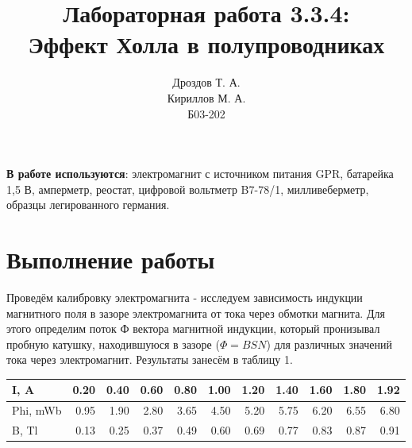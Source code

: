 \documentclass[a4paper]{article}
\title{Лабораторная работа 3.3.4:\\Эффект Холла в полупроводниках}
\author{Дроздов Т. А.\\Кириллов М. А.\\Б03-202}
\date{}
\begin{document}
\maketitle

\textbf{В работе используются}: электромагнит с источником питания GPR, батарейка 1,5 В, амперметр, реостат, цифровой вольтметр B7-78/1, милливеберметр, образцы легированного германия.


\section*{Выполнение работы}


    Проведём калибровку электромагнита - исследуем зависимость индукции магнитного поля в зазоре электромагнита от тока через обмотки магнита. Для этого определим поток Ф вектора магнитной индукции, который пронизывал пробную катушку, находившуюся в зазоре ($\Phi = BSN$) для различных значений тока через электромагнит. Результаты занесём в таблицу 1.
    

\begin{table}[]
\begin{tabular}{|l|r|r|r|r|r|r|r|r|r|r|}
\hline
I, A     & 0.20 & 0.40 & 0.60 & 0.80 & 1.00 & 1.20 & 1.40 & 1.60 & 1.80 & 1.92 \\ \hline
Phi, mWb & 0.95 & 1.90 & 2.80 & 3.65 & 4.50 & 5.20 & 5.75 & 6.20 & 6.55 & 6.80 \\ \hline
B, Tl    & 0.13 & 0.25 & 0.37 & 0.49 & 0.60 & 0.69 & 0.77 & 0.83 & 0.87 & 0.91 \\ \hline
\end{tabular}
\end{table}
\end{document}
